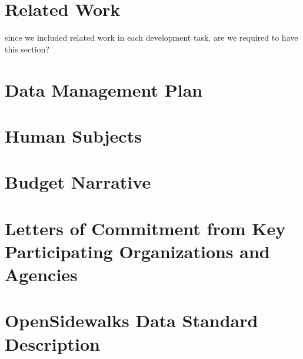 \documentclass[12pt,letterpaper]{article}
\newcommand{\ac}[1]{{\color{red}#1}}
\begin{document}
\section{Related Work}
\ac{since we included related work in each development task, are we required to have this section?}
%

\renewcommand{\thepage}{}
\begin{appendices}
\section{Data Management Plan}

\section{Human Subjects}

\section{Budget Narrative}
\label{budget}

\section{Letters of Commitment from Key Participating Organizations and Agencies}

\section{OpenSidewalks Data Standard Description}

\label{sec:standarddata}
\end{appendices}

\pagebreak



\end{document}
